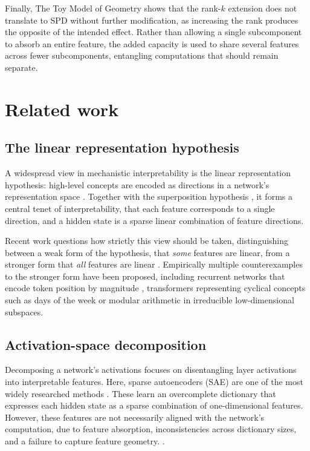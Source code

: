 \documentclass{article}
\begin{document}
Finally, The Toy Model of Geometry shows that the rank-$k$ extension does not translate to SPD
without further modification, as increasing the rank produces the opposite of the intended effect.
Rather than allowing a single subcomponent to absorb an entire feature, the added capacity is used
to share several features across fewer subcomponents, entangling computations that should remain
separate.


\section{Related work}
\subsection{The linear representation hypothesis}
A widespread view in mechanistic interpretability is the linear
representation hypothesis: high-level concepts are encoded as directions
in a network's representation space \autocite{park2024linearrepresentationhypothesisgeometry}.
Together with the superposition hypothesis \autocite{elhage2022toymodelssuperposition},
it forms a central tenet of interpretability, that each feature corresponds
to a single direction, and a hidden state is a sparse linear
combination of feature directions.

Recent work questions how strictly this view should be taken,
distinguishing between a weak form of the hypothesis,
that \textit{some} features are linear, from a stronger form that
\textit{all} features are linear \autocite{mendel2024sae,smith2024strong}. 
Empirically multiple counterexamples to
the stronger form have been proposed, including recurrent
networks that encode token position by magnitude
\autocite{csordás2024recurrentneuralnetworkslearn}, transformers
representing cyclical concepts such as days of the week
\autocite{engels2025languagemodelfeaturesonedimensionally} or modular
arithmetic \autocite{nanda2023progressmeasuresgrokkingmechanistic} in
irreducible low-dimensional subspaces.
\subsection{Activation-space decomposition}
Decomposing a network's activations  focuses on disentangling layer activations into interpretable features.
Here, sparse autoencoders (SAE) are one of the most widely researched methods \autocite{sparseautoencodershighlyinterpretable, bricken2023monosemanticity}.
These learn an overcomplete dictionary that expresses each hidden state as a sparse combination of one-dimensional features.
However, these features are not necessarily aligned with the network's computation, due to feature absorption, inconsistencies across dictionary sizes, and a failure to capture feature geometry.
 \autocite{absorptionstudyingfeaturesplitting, sparseautoencoderscanonicalunits,mendel2024sae}.
\end{document}
